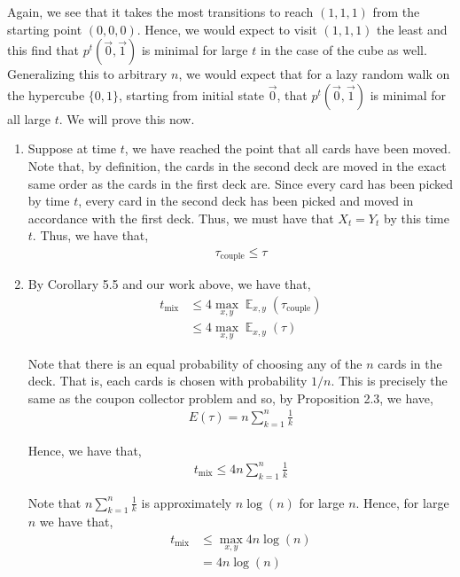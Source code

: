 \documentclass[12pt]{article}
\newenvironment{problem}[2][Problem]{\begin{trivlist}
\item[\hskip \labelsep {\bfseries #1}\hskip \labelsep {\bfseries #2.}]}{\end{trivlist}}
\DeclareMathOperator*{\E}{\mathbb{E}}
\begin{document}
Again, we see that it takes the most transitions to reach $(1, 1, 1)$ from the starting point $(0, 0, 0)$. Hence, we would expect to visit $(1, 1, 1)$ the least and this find that $p^t(\vec{0}, \vec{1})$ is minimal for large $t$ in the case of the cube as well.\\

Generalizing this to arbitrary $n$, we would expect that for a lazy random walk on the hypercube $\{0, 1\}$, starting from initial state $\vec{0}$, that $p^t(\vec{0}, \vec{1})$ is minimal for all large $t$. We will prove this now.

\begin{problem}{III}
\end{problem}

\begin{problem}{IV}
\end{problem}

\begin{enumerate}[label=(\Alph*)]

\item Suppose at time $t$, we have reached the point that all cards have been moved. Note that, by definition, the cards in the second deck are moved in the exact same order as the cards in the first deck are. Since every card has been picked by time $t$, every card in the second deck has been picked and moved in accordance with the first deck. Thus, we must have that $X_t = Y_t$ by this time $t$. Thus, we have that,
\begin{align*}
\tau_{\text{couple}} \leq \tau
\end{align*}

\item By Corollary 5.5 and our work above, we have that,
\begin{align*}
t_{\text{mix}} &\leq 4\max_{x,y} \E_{x,y} (\tau_{\text{couple}})\\
&\leq 4\max_{x,y} \E_{x,y} (\tau)
\end{align*}

Note that there is an equal probability of choosing any of the $n$ cards in the deck. That is, each cards is chosen with probability $1/n$. This is precisely the same as the coupon collector problem and so, by Proposition 2.3, we have,
\begin{align*}
E(\tau) = n \sum_{k=1}^n \frac{1}{k}
\end{align*}

Hence, we have that,
\begin{align*}
t_{\text{mix}} \leq 4n \sum_{k=1}^n \frac{1}{k}
\end{align*}

Note that $n \sum_{k=1}^n \frac{1}{k}$ is approximately $n\log(n)$ for large $n$. Hence, for large $n$ we have that,
\begin{align*}
t_{\text{mix}} &\leq \max_{x,y} 4n\log(n)\\
&= 4n\log(n)
\end{align*}
\end{enumerate}
\end{document}
